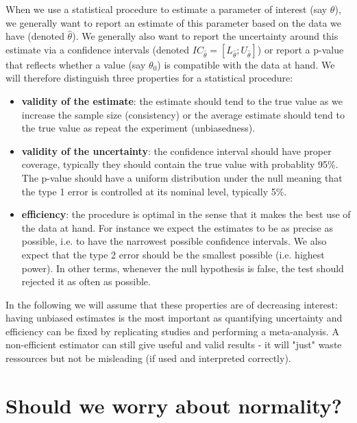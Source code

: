 \documentclass[12pt]{article}
\begin{document}
When we use a statistical procedure to estimate a parameter of
interest (say \(\theta\)), we generally want to report an estimate of
this parameter based on the data we have (denoted
\(\widehat{\theta}\)). We generally also want to report the
uncertainty around this estimate via a confidence intervals (denoted
\(IC_{\widehat{\theta}} = [L_{\widehat{\theta}} ;
U_{\widehat{\theta}}]\)) or report a p-value that reflects whether a
value (say \(\theta_0\)) is compatible with the data at hand. We will
therefore distinguish three properties for a statistical procedure:
\begin{itemize}
\item \textbf{validity of the estimate}: the estimate should tend to the true
value as we increase the sample size (consistency) or the average
estimate should tend to the true value as repeat the
experiment (unbiasedness).
\item \textbf{validity of the uncertainty}: the confidence interval should have
proper coverage, typically they should contain the true value with
probablity 95\%. The p-value should have a uniform distribution under
the null meaning that the type 1 error is controlled at its nominal
level, typically 5\%.
\item \textbf{efficiency}: the procedure is optimal in the sense that it makes
the best use of the data at hand. \newline For instance we expect
the estimates to be as precise as possible, i.e. to have the
narrowest possible confidence intervals. We also expect that the
type 2 error should be the smallest possible (i.e. highest
power). In other terms, whenever the null hypothesis is false, the
test should rejected it as often as possible.
\end{itemize}

\bigskip

In the following we will assume that these properties are of
decreasing interest: having unbiased estimates is the most important
as quantifying uncertainty and efficiency can be fixed by
replicating studies and performing a meta-analysis. A non-efficient
estimator can still give useful and valid results - it will "just"
waste ressources but not be misleading (if used and interpreted
correctly).

\clearpage

\section{Should we worry about normality?}
\label{sec:orge958418}
\end{document}
